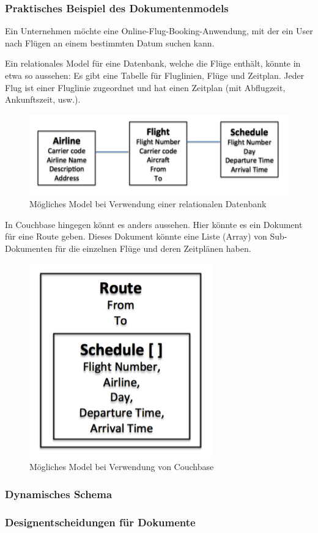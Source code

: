 \subsubsection{Praktisches Beispiel des Dokumentenmodels}
Ein Unternehmen möchte eine Online-Flug-Booking-Anwendung, mit der ein User nach Flügen an einem bestimmten Datum suchen kann.

Ein relationales Model für eine Datenbank, welche die Flüge enthält, könnte in etwa so aussehen: Es gibt eine Tabelle für Fluglinien, Flüge und Zeitplan. Jeder Flug ist einer Fluglinie zugeordnet und hat einen Zeitplan (mit Abflugzeit, Ankunftszeit, usw.).

\begin{figure}[!h]
	\begin{center}
		\includegraphics[width=0.4\linewidth]{images/relational-model-flight-status.png}
		\caption{Mögliches Model bei Verwendung einer relationalen Datenbank}
	\end{center}
\end{figure}

In Couchbase hingegen könnt es anders aussehen. Hier könnte es ein Dokument für eine Route geben. Dieses Dokument könnte eine Liste (Array) von Sub-Dokumenten für die einzelnen Flüge und deren Zeitplänen haben.

\begin{figure}[!h]
	\begin{center}
		\includegraphics[width=0.15\linewidth]{images/document-data-model-flight-booking.png}
		\caption{Mögliches Model bei Verwendung von Couchbase}
	\end{center}
\end{figure}

\subsubsection{Dynamisches Schema}

\subsubsection{Designentscheidungen für Dokumente}

